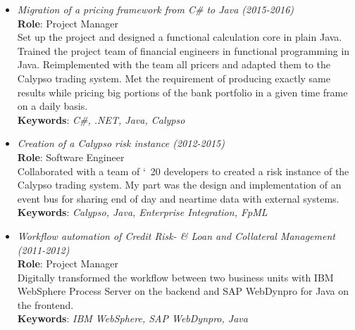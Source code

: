 \documentclass[10pt,a4paper,colorlinks=true]{moderncv}
\begin{document}
{\begin{itemize}
          Solved backend data synchronization challenges in a distributed, eventually persistent architecture with private data portions per bank.
          Created a frontend with React, TypeScript and Ant Design.
          Implemented the backend with Spring Boot and the Ethereum blockchain. \\[2pt]
          \textbf{Keywords}: \textit{Ethereum, React, TypeScript, Node.js, Spring Boot}
    \item \textit{Migration of a pricing framework from C\# to Java (2015-2016)} \\[2pt]
          \textbf{Role}: Project Manager \\[2pt]
          Set up the project and designed a functional calculation core in plain Java.
          Trained the project team of financial engineers in functional programming in Java.
          Reimplemented with the team all pricers and adapted them to the Calypso trading system.
          Met the requirement of producing exactly same results while pricing big portions of the bank portfolio in a given time frame on a daily basis. \\[2pt]
          \textbf{Keywords}: \textit{C\#, .NET, Java, Calypso}
    \item \textit{Creation of a Calypso risk instance (2012-2015)} \\[2pt]
          \textbf{Role}: Software Engineer \\[2pt]
          Collaborated with a team of \char`~20 developers to created a risk instance of the Calypso trading system.
          My part was the design and implementation of an event bus for sharing end of day and neartime data with external systems. \\[2pt]
          \textbf{Keywords}: \textit{Calypso, Java, Enterprise Integration, FpML}
    \item \textit{Workflow automation of Credit Risk- \& Loan and Collateral Management (2011-2012)} \\[2pt]
          \textbf{Role}: Project Manager \\[2pt]
          Digitally transformed the workflow between two business units with IBM WebSphere Process Server on the backend
          and SAP WebDynpro for Java on the frontend. \\[2pt]
          \textbf{Keywords}: \textit{IBM WebSphere, SAP WebDynpro, Java}
  \end{itemize}
}
\end{document}

